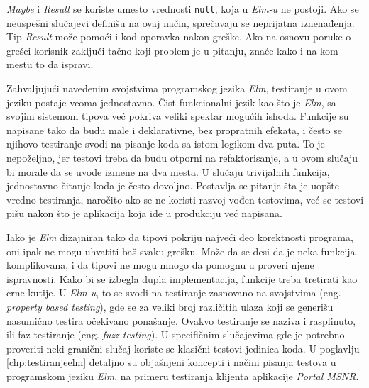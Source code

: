 \documentclass[12pt,oneside]{memoir}
\begin{document}
\par \emph{Maybe} i \emph{Result} se koriste umesto vrednosti \texttt{null}, koja u \emph{Elm-u} ne postoji. Ako se neuspešni slučajevi definišu na ovaj način, sprečavaju se neprijatna iznenađenja. Tip \emph{Result} može pomoći i kod oporavka nakon greške. Ako na osnovu poruke o grešci korisnik zaključi tačno koji problem je u pitanju, znaće kako i na kom mestu to da ispravi. 
\par Zahvaljujući navedenim svojstvima programskog jezika \emph{Elm}, testiranje u ovom jeziku postaje veoma jednostavno. Čist funkcionalni jezik kao što je \emph{Elm}, sa svojim sistemom tipova već pokriva veliki spektar mogućih ishoda. Funkcije su napisane tako da budu male i deklarativne, bez propratnih efekata, i često se njihovo testiranje svodi na pisanje koda sa istom logikom dva puta. To je nepoželjno, jer testovi treba da budu otporni na refaktorisanje, a u ovom slučaju bi morale da se uvode izmene na dva mesta. U slučaju trivijalnih funkcija, jednostavno čitanje koda je često dovoljno. Postavlja se pitanje šta je uopšte vredno testiranja, naročito ako se ne koristi razvoj vođen testovima, već se testovi pišu nakon što je aplikacija koja ide u produkciju već napisana.
\par Iako je \emph{Elm} dizajniran tako da tipovi pokriju najveći deo korektnosti programa, oni ipak ne mogu uhvatiti baš svaku grešku. Može da se desi da je neka funkcija komplikovana, i da tipovi ne mogu mnogo da pomognu u proveri njene ispravnosti. Kako bi se izbegla dupla implementacija, funkcije treba tretirati kao crne kutije. U \emph{Elm-u}, to se svodi na testiranje zasnovano na svojstvima (eng. \emph{property based testing}), gde se za veliki broj različitih ulaza koji se generišu nasumično testira očekivano ponašanje. Ovakvo testiranje se naziva i rasplinuto, ili faz testiranje (eng. \emph{fuzz testing}). U specifičnim slučajevima gde je potrebno proveriti neki granični slučaj koriste se klasični testovi jedinica koda. U poglavlju \ref{chp:testiranjeelm} detaljno su objašnjeni koncepti i načini pisanja testova u programskom jeziku \emph{Elm}, na primeru testiranja klijenta aplikacije \emph{Portal MSNR}.

\end{document}
